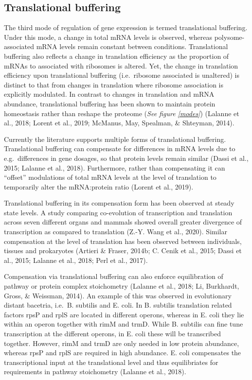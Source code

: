 \documentclass[12pt,openany]{book}
\begin{document}
\subsection{Translational buffering} \label{modeBuffering}

The third mode of regulation of gene expression is termed translational
buffering. Under this mode, a change in total mRNA levels is observed,
whereas polysome-associated mRNA levels remain constant between
conditions. Translational buffering also reflects a change in
translation efficiency as the proportion of mRNAs to associated with
ribosomes is altered. Yet, the change in translation efficiency upon
translational buffering (i.e.~ribosome associated is unaltered) is
distinct to that from changes in translation where ribosome association
is explicitly modulated. In contrast to changes in translation and mRNA
abundance, translational buffering has been shown to maintain protein
homeostasis rather than reshape the proteome (\emph{See figure
\ref{modes}}) (Lalanne et al., 2018; Lorent et al., 2019; McManus, May,
Spealman, \& Shteyman, 2014).

Currently the literature supports multiple forms of translational
buffering. Translational buffering can compensate for differences in
mRNA levels due to e.g.~differences in gene dosages, so that protein
levels remain similar (Dassi et al., 2015; Lalanne et al., 2018).
Furthermore, rather than compensating it can ``offset'' modulations of
total mRNA levels at the level of translation to temporarily alter the
mRNA:protein ratio (Lorent et al., 2019).

Translational buffering in its compensation form has been observed at
steady state levels. A study comparing co-evolution of transcription and
translation across seven different organs and mammals showed overall
greater divergence of transcription as compared to translation (Z.-Y.
Wang et al., 2020). Similar compensation at the level of translation has
been observed between individuals, tissues and prokaryotes (Artieri \&
Fraser, 2014b; C. Cenik et al., 2015; Dassi et al., 2015; Lalanne et
al., 2018; Perl et al., 2017).

Compensation via translational buffering can also enforce equilibration
of pathway or protein complex stoichometry (Lalanne et al., 2018; Li,
Burkhardt, Gross, \& Weissman, 2014). An example of this was observed in
evolutionary distant bacetria, i.e.~B. subtilis and E. coli. In B.
subtilis translation related factors rpsP and rplS are located in
different operons, whereas in E. coli they lie within an operon together
with rimM and trmD. While B. subtilis can fine tune transcription at the
different operons, in E. coli these will be transcribed together.
However, rimM and trmD are only needed in low protein abundance, whereas
rpsP and rplS are required in high abundance. E. coli compensates the
transcriptional input at the translational level and thus equilibriates
for requirements in pathway stoichometry (Lalanne et al., 2018).
\end{document}
